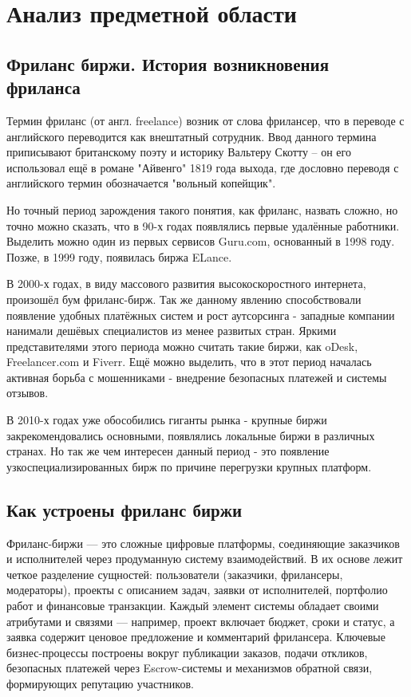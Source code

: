 \section{Анализ предметной области}
\subsection{Фриланс биржи. История возникновения фриланса}

Термин фриланс (от англ. freelance) возник от слова фрилансер, что в переводе с английского переводится как внештатный сотрудник. Ввод данного термина приписывают британскому поэту и историку Вальтеру Скотту -- он его использовал ещё в романе "Айвенго" 1819 года выхода, где дословно переводя с английского термин обозначается "вольный копейщик".

Но точный период зарождения такого понятия, как фриланс, назвать сложно, но точно можно сказать, что в 90-х годах появлялись первые удалённые работники. Выделить можно один из первых сервисов Guru.com, основанный в 1998 году. Позже, в 1999 году, появилась биржа ELance.

В 2000-х годах, в виду массового развития высокоскоростного интернета, произошёл бум фриланс-бирж. Так же данному явлению способствовали появление удобных платёжных систем и рост аутсорсинга - западные компании нанимали дешёвых специалистов из менее развитых стран. Яркими представителями этого периода можно считать такие биржи, как oDesk, Freelancer.com и Fiverr. Ещё можно выделить, что в этот период началась активная борьба с мошенниками - внедрение безопасных платежей и системы отзывов.

В 2010-х годах уже обособились гиганты рынка - крупные биржи закрекомендовались основными, появлялись локальные биржи в различных странах. Но так же чем интересен данный период - это появление узкоспециализированных бирж по причине перегрузки крупных платформ. 

\subsection{Как устроены фриланс биржи}

Фриланс-биржи — это сложные цифровые платформы, соединяющие заказчиков и исполнителей через продуманную систему взаимодействий. В их основе лежит четкое разделение сущностей: пользователи (заказчики, фрилансеры, модераторы), проекты с описанием задач, заявки от исполнителей, портфолио работ и финансовые транзакции. Каждый элемент системы обладает своими атрибутами и связями — например, проект включает бюджет, сроки и статус, а заявка содержит ценовое предложение и комментарий фрилансера. Ключевые бизнес-процессы построены вокруг публикации заказов, подачи откликов, безопасных платежей через Escrow-системы и механизмов обратной связи, формирующих репутацию участников.

